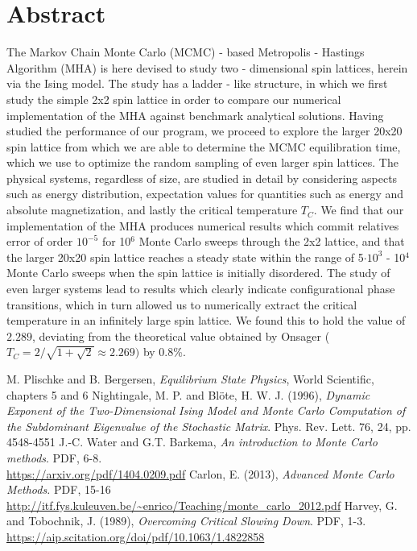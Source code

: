 	\section{Abstract}
    The Markov Chain Monte Carlo (MCMC) - based Metropolis - Hastings Algorithm (MHA) is here devised to study two - dimensional spin lattices, herein via the Ising model. The study has a ladder - like structure, in which we first study the simple 2x2 spin lattice in order to compare our numerical implementation of the MHA against benchmark analytical solutions. Having studied the performance of our program, we proceed to explore the larger 20x20 spin lattice from which we are able to determine the MCMC equilibration time, which we use to optimize the random sampling of even larger spin lattices. The physical systems, regardless of size, are studied in detail by considering aspects such as energy distribution, expectation values for quantities such as energy and absolute magnetization, and lastly the critical temperature $T_C$. We find that our implementation of the MHA produces numerical results which commit relatives error of order $10^{-5}$ for 10$^{6}$ Monte Carlo sweeps through the 2x2 lattice, and that the larger 20x20 spin lattice reaches a steady state within the range of 5$\cdot10^{3}$ - 10$^{4}$ Monte Carlo sweeps when the spin lattice is initially disordered. The study of even larger systems lead to results which clearly indicate configurational phase transitions, which in turn allowed us to numerically extract the critical temperature in an infinitely large spin lattice. We found this to hold the value of $2.289$, deviating from the theoretical value obtained by Onsager ($T_C = 2/\sqrt{1 + \sqrt{2}} \approx 2.269)$ by 0.8\%. 
	
	
	
	\newpage
	\tableofcontents
	\newpage
	
	
	 
	
	
	
	
	
	\newpage
	\begin{thebibliography}{5}
        M. Plischke and B. Bergersen, \textit{Equilibrium State Physics}, World Scientific, chapters 5 and 6
        Nightingale, M. P. and Bl\"ote, H. W. J. (1996), \textit{Dynamic Exponent of the Two-Dimensional Ising Model and Monte Carlo Computation of the Subdominant Eigenvalue of the Stochastic Matrix}. Phys. Rev. Lett. 76, 24, pp. 4548-4551
        J.-C. Water and G.T. Barkema, \textit{An introduction to Monte Carlo methods}. PDF, 6-8. \\
        \url{https://arxiv.org/pdf/1404.0209.pdf}
        Carlon, E. (2013), \textit{Advanced Monte Carlo Methods.} PDF, 15-16\\
        \url{http://itf.fys.kuleuven.be/~enrico/Teaching/monte_carlo_2012.pdf}
        Harvey, G. and Tobochnik, J. (1989), \textit{Overcoming Critical Slowing Down}. PDF, 1-3.\\
        \url{https://aip.scitation.org/doi/pdf/10.1063/1.4822858}
	\end{thebibliography}
	
 